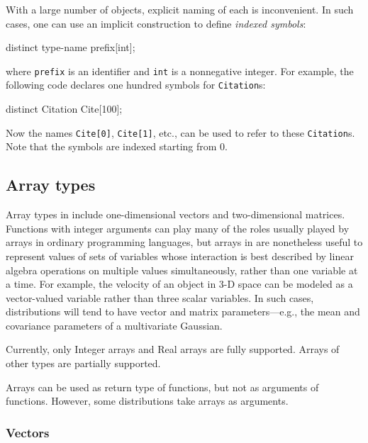 \documentclass[12pt]{article}
\begin{document}
With a large number of objects, explicit naming of each is inconvenient.
In such cases, one can use an implicit construction to define {\em indexed symbols}:
\begin{blogcode}
distinct type-name prefix[int];
\end{blogcode}
where {\tt prefix} is an identifier and {\tt int} is a nonnegative integer.
For example, the following \bl code declares one hundred symbols for {\tt Citation}s:
\begin{blogcode}
distinct Citation Cite[100];
\end{blogcode}
Now the names \verb|Cite[0]|, \verb|Cite[1]|, etc., can be used to refer to these {\tt Citation}s. Note that the symbols are indexed starting from 0.


\subsection{Array types}\label{array-section}

Array types in \bl include one-dimensional vectors and two-dimensional
matrices. Functions with integer arguments can play many of the roles
usually played by arrays in ordinary programming languages, but arrays in
\bl are nonetheless useful to represent values of sets of variables
whose interaction is best described by linear algebra operations on
multiple values simultaneously, rather than one variable at a time.
For example, the velocity of an object in 3-D space can be modeled
as a vector-valued variable rather than three scalar variables.
In such cases, distributions will tend to have vector and matrix
parameters---e.g., the mean and covariance parameters of a
multivariate Gaussian.


Currently, only Integer arrays and Real arrays are fully
supported. Arrays of other types are partially supported. 


Arrays can be used as return type of functions, but not as arguments of functions. However, some distributions take arrays as arguments.

\subsubsection{Vectors}\label{vector-section}

\end{document}

